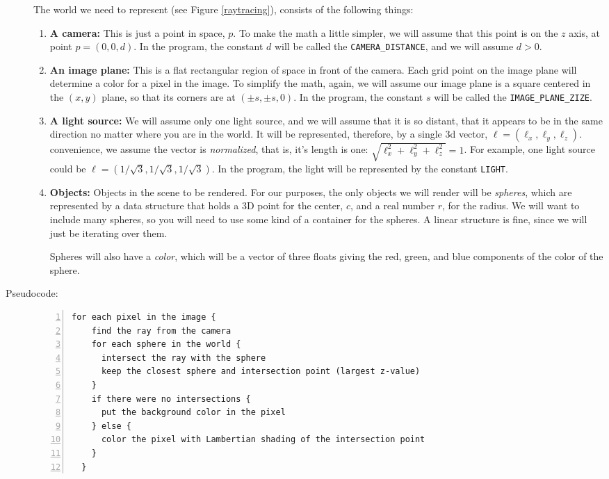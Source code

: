 \documentclass{article}
\begin{document}
\begin{description}
The world we need to represent (see Figure \ref{raytracing}), consists
of the following things:
\begin{enumerate}
\item{\bf A camera:} This is just a point in space, $p$.  To make the math
  a little simpler, we will assume that this point is on the $z$ axis,
  at point $p=(0,0,d)$. In the program, the constant $d$ will be
  called the \verb|CAMERA_DISTANCE|, and we will assume $d > 0$.
\item{\bf An image plane:} This is a flat rectangular region of space in
  front of the camera.  Each grid point on the image plane will
  determine a color for a pixel in the image.  To simplify the math,
  again, we will assume our image plane is a square centered in the
  $(x,y)$ plane, so that its corners are at $(\pm s , \pm s, 0)$.  In
  the program, the constant $s$ will be called the
  \verb|IMAGE_PLANE_ZIZE|.
\item{\bf A light source:} We will assume only one light source, and we
  will assume that it is so distant, that it appears to be in the same
  direction no matter where you are in the world.  It will be
  represented, therefore, by a single 3d vector, $\ell =
  (\ell_x,\ell_y,\ell_z)$.  convenience, we assume the vector is {\em
    normalized}, that is, it's length is one: $\sqrt{\ell_x^2 +
    \ell_y^2 + \ell_z^2} = 1$.  For example, one light source could be
  $\ell = (1/\sqrt{3},1/\sqrt{3},1/\sqrt{3})$.  In the program, the
  light will be represented by the constant \verb|LIGHT|.
\item{\bf Objects:} Objects in the scene to be rendered.  For our
  purposes, the only objects we will render will be {\em spheres},
  which are represented by a data structure that holds a 3D point for
  the center, $c$, and a real number $r$, for the radius.  We will
  want to include many spheres, so you will need to use some kind of a
  container for the spheres.  A linear structure is fine, since we
  will just be iterating over them.

  Spheres will also have a {\em color}, which will be a vector of
  three floats giving the red, green, and blue components of the color
  of the sphere.
\end{enumerate}


\item[Pseudocode:]\mbox{}
  
\begin{Verbatim}[frame=single,numbers=left]
  for each pixel in the image {
    find the ray from the camera
    for each sphere in the world {
      intersect the ray with the sphere
      keep the closest sphere and intersection point (largest z-value)
    }
    if there were no intersections {
      put the background color in the pixel
    } else {
      color the pixel with Lambertian shading of the intersection point
    }
  }
\end{Verbatim}    


\end{description}
\end{document}
